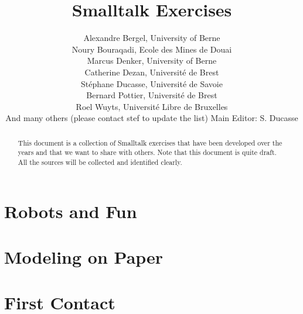 \let\wholebook=\relax


\title{Smalltalk Exercises}
\author{
Alexandre Bergel, University of Berne\\
Noury Bouraqadi, Ecole des Mines de Douai\\
Marcus Denker, University of Berne \\
Catherine Dezan, Universit\'e de Brest\\
St\'ephane Ducasse, Universit\'e de Savoie\\
Bernard Pottier, Universit\'e de Brest\\
Roel Wuyts, Universit\'e Libre de Bruxelles \\
And many others (please contact stef to update the list)
Main Editor: S. Ducasse}

\begin{abstract}
This document is a collection of Smalltalk exercises that 
have been developed over the years and that we want to share
with others. Note that this document is quite draft. All the sources will be collected and identified clearly. 
\end{abstract}
\maketitle

\tableofcontents

\part{Robots and Fun}


\part{Modeling on Paper}




\part{First Contact}











